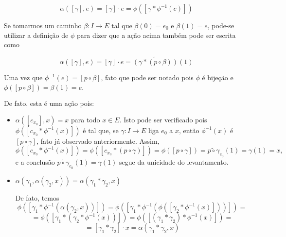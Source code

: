 $$\alpha([\gamma], e)=[\gamma]\cdot e=\phi([\gamma*\phi^{-1}(e)])$$

Se tomarmos um caminho $ \beta: I\rightarrow E$ tal que $\beta(0)=e_0$ e $\beta(1)=e$, pode-se utilizar a definição de $\phi$ para dizer que a ação acima também pode ser escrita como

$$\alpha([\gamma], e)=[\gamma]\cdot e = \widetilde{(\gamma*(p\circ \beta))}(1)$$

Uma vez que $\phi^{-1}(e)=[p\circ \beta]$, fato que pode ser notado pois $\phi$ é bijeção e $ \phi([p\circ \beta])=\beta(1)=e$.\newline

De fato, esta é uma ação pois:

\begin{itemize}
    \item $\alpha([c_{x_0}], x)=x$ para todo $x\in E.$\newline
    Isto pode ser verificado pois $\phi([c_{x_0}*\phi^{-1}(x)])$ é tal que, se $\gamma:I\rightarrow E$ liga $e_0$ a $x$, então $\phi^{-1}(x)$ é $[p\circ \gamma]$, fato já observado anteriormente. Assim, $$\phi([c_{x_0}*\phi^{-1}(x)])=\phi([c_{x_0}*(p\circ\gamma)])=\phi([p\circ \gamma])=\widetilde{p\circ \gamma}_{e_0}(1)=\gamma(1)=x,$$ e a conclusão $\widetilde{p\circ \gamma}_{e_0}(1)=\gamma(1)$ segue da unicidade do levantamento.\newline

    \item $\alpha(\gamma_1, \alpha(\gamma_2,x))=\alpha(\gamma_1*\gamma_2,x)$

    De fato, temos$$\phi([\gamma_1 * \phi^{-1}(\alpha(\gamma_2,x))])=\phi([\gamma_1*\phi^{-1}(\phi([\gamma_2*\phi^{-1}(x)]))])=$$ $$=\phi([\gamma_1*(\gamma_2*\phi^{-1}(x))])=\phi([(\gamma_1*\gamma_2)*\phi^{-1}(x)])=$$$$=[\gamma_1*\gamma_2]\cdot x=\alpha(\gamma_1*\gamma_2,x)$$
\end{itemize}







